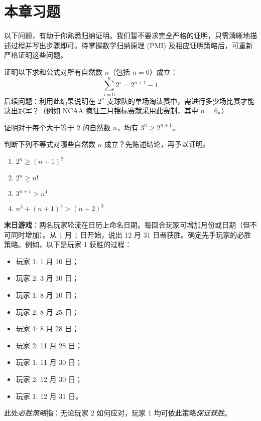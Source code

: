 \section{本章习题}

以下问题，有助于你熟悉归纳证明。我们暂不要求完全严格的证明，只需清晰地描述过程并写出步骤即可。待掌握数学归纳原理 (PMI) 及相应证明策略后，可重新严格证明这些问题。\\

\begin{exercise} \label{exc:exercises2.7.1}
    证明以下求和公式对所有自然数 $n$（包括 $n=0$）成立：
    \[\sum_{i=0}^{n}2^i=2^{n+1}-1\]
    后续问题：利用此结果说明在 $2^n$ 支球队的单场淘汰赛中，需进行多少场比赛才能决出冠军？（例如 NCAA 疯狂三月锦标赛就采用此赛制，其中 $n=6$。）
\end{exercise}

\begin{exercise}
    证明对于每个大于等于 $2$ 的自然数 $n$，均有 $3^n \ge 2^{n+1}$。
\end{exercise}

\begin{exercise}
    判断下列不等式对哪些自然数 $n$ 成立？先陈述结论，再予以证明。
    \begin{enumerate}
        \item $2^n \ge (n + 1)^2$
        \item $2^n \ge n!$
        \item $3^{n+1} > n^4$
        \item $n^3 + (n + 1)^3 > (n + 2)^3$
    \end{enumerate}
\end{exercise}

\begin{exercise}
    \textbf{末日游戏}：两名玩家轮流在日历上命名日期。每回合玩家可增加月份或日期（但不可同时增加）。从 1 月 1 日开始，说出 12 月 31 日者获胜。确定先手玩家的必胜策略。例如，以下是玩家 1 获胜的过程：
    \begin{itemize}
        \item 玩家 1: 1 月 10 日；
        \item 玩家 2: 3 月 10 日；
        \item 玩家 1: 8 月 10 日；
        \item 玩家 2: 8 月 25 日；
        \item 玩家 1: 8 月 28 日；
        \item 玩家 2: 11 月 28 日；
        \item 玩家 1: 11 月 30 日；
        \item 玩家 2: 12 月 30 日；
        \item 玩家 1: 12 月 31 日。
    \end{itemize}
    此处\emph{必胜策略}指：无论玩家 2 如何应对，玩家 1 均可依此策略\emph{保证获胜}。
\end{exercise}

